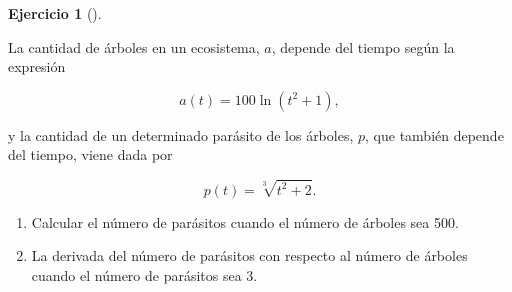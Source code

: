 \documentclass[
  a4paper,
]{scrreport}
\theoremstyle{definition}
\newtheorem{exercise}{Ejercicio}[chapter]
\theoremstyle{remark}
\begin{document}
\begin{exercise}[]\protect\hypertarget{exr-cinematica-tangente-normal-trayectoria}{}\label{exr-cinematica-tangente-normal-trayectoria}

La cantidad de árboles en un ecosistema, \(a\), depende del tiempo según
la expresión

\[
a(t)=100\ln(t^2+1),
\]

y la cantidad de un determinado parásito de los árboles, \(p\), que
también depende del tiempo, viene dada por

\[
p(t) = \sqrt[3]{{t^2  + 2}}.
\]

\begin{enumerate}
\def\labelenumi{\alph{enumi}.}
\item
  Calcular el número de parásitos cuando el número de árboles sea 500.
\item
  La derivada del número de parásitos con respecto al número de árboles
  cuando el número de parásitos sea 3.
\end{enumerate}

\end{exercise}

\begin{tcolorbox}[enhanced jigsaw, opacitybacktitle=0.6, bottomrule=.15mm, colback=white, breakable, leftrule=.75mm, toprule=.15mm, colframe=quarto-callout-tip-color-frame, colbacktitle=quarto-callout-tip-color!10!white, coltitle=black, left=2mm, opacityback=0, rightrule=.15mm, bottomtitle=1mm, arc=.35mm, titlerule=0mm, title=\textcolor{quarto-callout-tip-color}{\faLightbulb}\hspace{0.5em}{Solución}, toptitle=1mm]

\end{tcolorbox}
\end{document}
